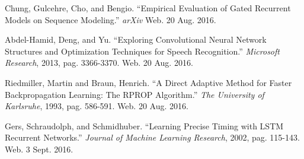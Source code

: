 \documentclass{article}
\begin{document}
\begin{thebibliography}{9}
		Chung, Gulcehre, Cho, and Bengio. ``Empirical Evaluation of Gated
		Recurrent Models on Sequence Modeling.'' \textit{arXiv} Web. 20 Aug.
		2016.

		Abdel-Hamid, Deng, and Yu. ``Exploring Convolutional Neural Network
		Structures and Optimization Techniques for Speech Recognition.''
		\textit{Microsoft Research}, 2013, pag. 3366-3370. Web. 20 Aug. 2016.

		Riedmiller, Martin and Braun, Henrich. ``A Direct Adaptive Method for
		Faster Backpropagation Learning: The RPROP Algorithm.'' \textit{The
		University of Karlsruhe}, 1993, pag. 586-591. Web. 20 Aug. 2016.

		Gers, Schraudolph, and Schmidhuber. ``Learning Precise Timing with LSTM
		Recurrent Networks.'' \textit{Journal of Machine Learning Research},
		2002, pag. 115-143. Web. 3 Sept. 2016.
\end{thebibliography}
\end{document}
